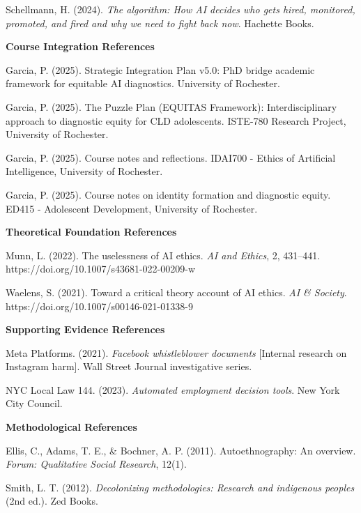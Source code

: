 \documentclass[12pt,letterpaper]{article}
\begin{document}
Schellmann, H. (2024). \textit{The algorithm: How AI decides who gets hired, monitored, promoted, and fired and why we need to fight back now}. Hachette Books.

\textbf{Course Integration References}

Garcia, P. (2025). Strategic Integration Plan v5.0: PhD bridge academic framework for equitable AI diagnostics. University of Rochester.

Garcia, P. (2025). The Puzzle Plan (EQUITAS Framework): Interdisciplinary approach to diagnostic equity for CLD adolescents. ISTE-780 Research Project, University of Rochester.

Garcia, P. (2025). Course notes and reflections. IDAI700 - Ethics of Artificial Intelligence, University of Rochester.

Garcia, P. (2025). Course notes on identity formation and diagnostic equity. ED415 - Adolescent Development, University of Rochester.

\textbf{Theoretical Foundation References}

Munn, L. (2022). The uselessness of AI ethics. \textit{AI and Ethics}, 2, 431–441. https://doi.org/10.1007/s43681-022-00209-w

Waelens, S. (2021). Toward a critical theory account of AI ethics. \textit{AI \& Society}. https://doi.org/10.1007/s00146-021-01338-9

\textbf{Supporting Evidence References}

Meta Platforms. (2021). \textit{Facebook whistleblower documents} [Internal research on Instagram harm]. Wall Street Journal investigative series.

NYC Local Law 144. (2023). \textit{Automated employment decision tools}. New York City Council.

\textbf{Methodological References}

Ellis, C., Adams, T. E., \& Bochner, A. P. (2011). Autoethnography: An overview. \textit{Forum: Qualitative Social Research}, 12(1).

Smith, L. T. (2012). \textit{Decolonizing methodologies: Research and indigenous peoples} (2nd ed.). Zed Books.
\end{document}

